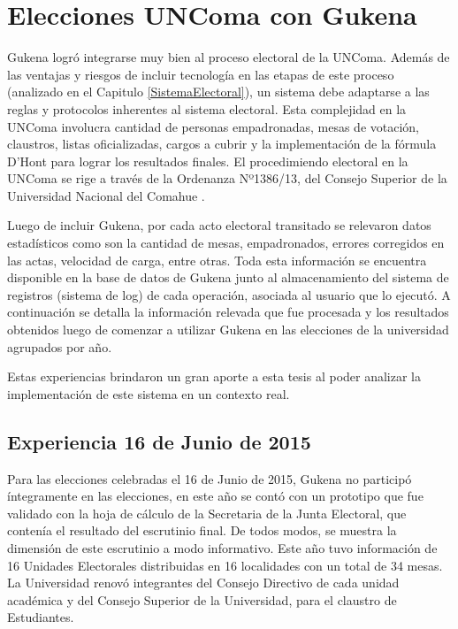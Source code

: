 \chapter{Elecciones UNComa con Gukena}
\label{Gukena2}

Gukena logró integrarse muy bien al proceso electoral de la UNComa. Además de las ventajas y riesgos de incluir tecnología en las etapas de este proceso (analizado en el Capitulo \ref{SistemaElectoral}), un sistema debe adaptarse a las reglas y protocolos inherentes al sistema electoral. Esta complejidad en la UNComa involucra cantidad de personas empadronadas, mesas de votación, claustros, listas oficializadas, cargos a cubrir y la implementación de la fórmula D'Hont para lograr los resultados finales. El procedimiendo electoral en la UNComa se rige a través de la Ordenanza Nº1386/13, del Consejo Superior de la Universidad Nacional del Comahue \cite{ordenanzaUncoma}.


Luego de incluir Gukena, por cada acto electoral transitado se relevaron datos estadísticos como son la cantidad de mesas, empadronados, errores corregidos en las actas, velocidad de carga, entre otras. Toda esta información se encuentra disponible en la base de datos de Gukena junto al almacenamiento del sistema de registros (sistema de log) de cada operación, asociada al usuario que lo ejecutó.
A continuación se detalla la información relevada que fue procesada y los resultados obtenidos luego de comenzar a utilizar Gukena en las elecciones de la universidad agrupados por año. 

Estas experiencias brindaron un gran aporte a esta tesis al poder analizar la implementación de este sistema en un contexto real.

\section{Experiencia 16 de Junio de 2015}
Para las elecciones celebradas el 16 de Junio de 2015, Gukena no participó íntegramente en las elecciones, en este año se contó con un prototipo que fue validado con la hoja de cálculo de la Secretaria de la Junta Electoral, que contenía el resultado del escrutinio final. De todos modos, se muestra la dimensión de este escrutinio a modo informativo. Este año tuvo información de 16 Unidades Electorales distribuidas en 16 localidades con un total de 34 mesas. 
La Universidad renovó integrantes del Consejo Directivo de cada unidad académica y del Consejo Superior de la Universidad, para el claustro de Estudiantes.

